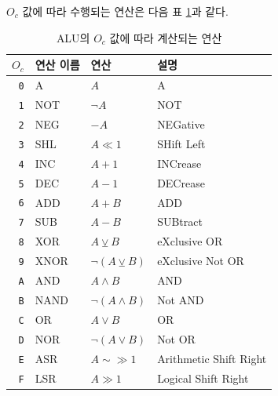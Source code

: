 \documentclass{article}
\renewcommand{\tablename}{표}
\begin{document}
$O_c$ 값에 따라 수행되는 연산은 다음 \tablename{} \ref{tab:aluopc}과 같다.

\begin{table}[h]
    \centering
    \begin{tabular}{rl|ll}
        $O_c$ & 연산 이름 & 연산 & 설명\\
        \hline
        \texttt 0 & A    & $A$ & A \\
        \texttt 1 & NOT  & $\neg A$ & NOT \\
        \texttt 2 & NEG  & $- A$ & NEGative \\
        \texttt 3 & SHL  & $A \ll 1$ & SHift Left \\
        \texttt 4 & INC  & $A + 1$ & INCrease \\
        \texttt 5 & DEC  & $A - 1$ & DECrease \\
        \texttt 6 & ADD  & $A + B$ & ADD \\
        \texttt 7 & SUB  & $A - B$ & SUBtract \\
        \texttt 8 & XOR  & $A \veebar B$ & eXclusive OR \\
        \texttt 9 & XNOR & $\neg (A \veebar B)$ & eXclusive Not OR \\
        \texttt A & AND  & $A \wedge B$ & AND \\
        \texttt B & NAND & $\neg (A \wedge B)$ & Not AND \\
        \texttt C & OR   & $A \vee B$ & OR \\
        \texttt D & NOR  & $\neg (A \vee B)$ & Not OR \\
        \texttt E & ASR  & $A \sim\gg 1$ & Arithmetic Shift Right \\
        \texttt F & LSR  & $A \gg 1$ & Logical Shift Right \\
    \end{tabular}
    \caption{ALU의 $O_c$ 값에 따라 계산되는 연산}
    \label{tab:aluopc}
\end{table}
\end{document}
